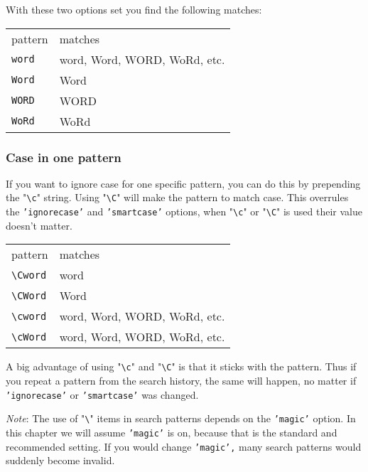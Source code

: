 With these two options set you find the following matches:

\begin{center} \begin{tabular}{l l}
				pattern & matches \\
				\texttt{word} & word, Word, WORD, WoRd, etc.\\
				\texttt{Word} & Word\\
				\texttt{WORD} & WORD\\
				\texttt{WoRd} & WoRd\\
\end{tabular} \end{center}

\subsubsection{Case in one pattern}
If you want to ignore case for one specific pattern, you can do this by prepending the "\texttt{\textbackslash{}c}" string.
Using "\texttt{\textbackslash{}C}" will make the pattern to match case.
This overrules the \texttt{'ignorecase'} and \texttt{'smartcase'} options, when "\texttt{\textbackslash{}c}" or "\texttt{\textbackslash{}C}" is used their value doesn't matter.

\begin{center} \begin{tabular}{l l}
				pattern & matches \\
				\texttt{\textbackslash{}Cword} & word\\
				\texttt{\textbackslash{}CWord} & Word\\
				\texttt{\textbackslash{}cword} & word, Word, WORD, WoRd, etc.\\
				\texttt{\textbackslash{}cWord} & word, Word, WORD, WoRd, etc.\\
\end{tabular} \end{center}

A big advantage of using "\texttt{\textbackslash{}c}" and "\texttt{\textbackslash{}C}" is that it sticks with the pattern.
Thus if you repeat a pattern from the search history, the same will happen, no matter if \texttt{'ignorecase'} or \texttt{'smartcase'} was changed.

\emph{Note}: The use of "\texttt{\textbackslash{}}" items in search patterns depends on the \texttt{'magic'} option.
In this chapter we will assume \texttt{'magic'} is on, because that is the standard and recommended setting.
If you would change \texttt{'magic',} many search patterns would suddenly become invalid.

